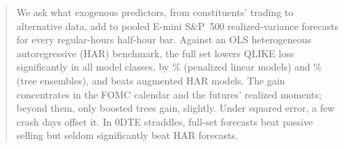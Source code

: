 \documentclass[11pt]{article}
\makeatletter
\DeclareRobustCommand{\rhPending}{\@ifnextchar\bgroup{\rh@pending}{\textit{pending}}}
\newcommand{\rh@pending}[1]{%
  \if\relax\detokenize{#1}\relax\textit{pending}\else\textit{[pending: \texttt{\detokenize{#1}}]}\fi}
\makeatother
\begin{document}
\begin{abstract}
We ask what exogenous predictors, from constituents' trading to alternative data, add to pooled E-mini S\&P~500
realized-variance forecasts for every regular-hours half-hour bar. Against an OLS heterogeneous autoregressive (HAR)
benchmark, the full set lowers QLIKE loss significantly in all \rhorAfPairs{} model classes, by
\rhorVsOlsRedLinRng{}\% (penalized linear models) and \rhorVsOlsRedTreeRng{}\% (tree
ensembles), and beats augmented HAR models. The gain concentrates in the FOMC calendar and the futures' realized
moments; beyond them, only boosted trees gain, slightly. Under squared error, a few crash days offset it. In 0DTE
straddles, full-set forecasts beat passive selling but seldom significantly beat HAR forecasts.
\end{abstract}
\end{document}
